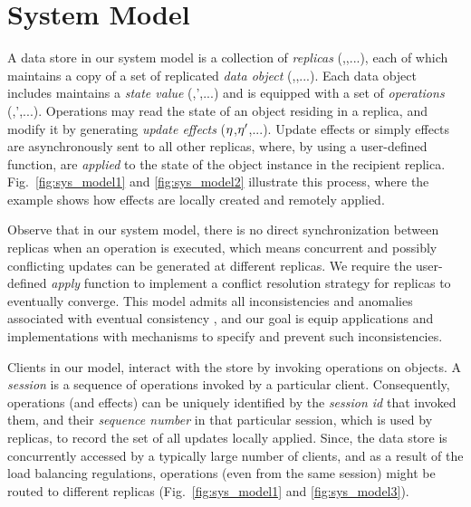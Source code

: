 \section{System Model}
\label{sec:sys_model}

A data store in our system model is a collection of \emph{replicas}
(,,...), each of which maintains a copy of a set of
replicated \emph{data object} (\xO,\yO,...).  Each data object includes
maintains a \emph{state value} (\vO,\vO',...) and is equipped with a set of \emph{operations}
(\opO,\opO',...). Operations may read the state of an object
residing in a replica, and modify it by generating \emph{update
effects} ($\eta$,$\eta'$,...).
Update effects
or simply effects are asynchronously sent to all other replicas, where,
by using a
user-defined function, are \emph{applied} to the state of the object
instance in the recipient replica. 
Fig.~\ref{fig:sys_model1} and \ref{fig:sys_model2} illustrate this
process, where the example shows how effects are locally created and
remotely applied. 

Observe that in our system model, there is no direct synchronization between replicas when an
operation is executed, which means concurrent and possibly conflicting
updates can be generated at different replicas. We
require the user-defined \emph{apply} function to implement a conflict
resolution strategy for replicas to eventually converge. 
This model admits all inconsistencies and anomalies
associated with eventual consistency \cite{quelea,terry}, and our goal is equip
applications and implementations with mechanisms to specify and prevent
such inconsistencies. 

Clients in our model, interact with the store by invoking operations on objects.
A \emph{session} is a sequence of operations invoked by a particular
client. Consequently, operations (and effects) can be uniquely
identified by the \emph{session id} that invoked them, and
their \emph{sequence number} in that particular session, which is used
by replicas, to record the set of all updates locally applied.
Since, the data
store is concurrently accessed by a typically large number of clients,
and as a result of the load balancing regulations,
operations (even from the same session) might be routed to different
replicas (Fig.~\ref{fig:sys_model1} and
\ref{fig:sys_model3}). 


